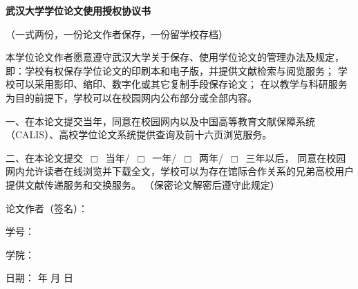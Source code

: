 %
%

\newpage
\vspace*{20pt}
\thispagestyle{empty}
\begin{center}{\heiti \bfseries 武汉大学学位论文使用授权协议书}\end{center}

\vspace*{4pt}

\begin{center}{（一式两份，一份论文作者保存，一份留学校存档）}\end{center}

\vspace*{4pt}

本学位论文作者愿意遵守武汉大学关于保存、使用学位论文的管理办法及规定，
即：学校有权保存学位论文的印刷本和电子版，并提供文献检索与阅览服务；
学校可以采用影印、缩印、数字化或其它复制手段保存论文；
在以教学与科研服务为目的前提下，学校可以在校园网内公布部分或全部内容。

一、在本论文提交当年，同意在校园网内以及中国高等教育文献保障系统（CALIS）、高校学位论文系统提供查询及前十六页浏览服务。

二、在本论文提交~$\Box$~当年/~$\Box$~一年/~$\Box$~两年/~$\Box$~三年以后，
同意在校园网内允许读者在线浏览并下载全文，学校可以为存在馆际合作关系的兄弟高校用户提供文献传递服务和交换服务。
（保密论文解密后遵守此规定）

\vskip 0.8cm

论文作者（签名）：\raisebox{-1ex}{\underline{\makebox[3.54cm][c]{}}}
\vskip 0.8cm

学\qquad 号：\raisebox{-1ex}{\underline{\makebox[5cm][c]{}}}
\vskip 0.8cm

学\qquad 院：\raisebox{-1ex}{\underline{\makebox[5cm][c]{}}}

\vskip 1cm
\begin{flushright}
日期：\hskip2cm 年\hskip1.2cm 月\hskip1.2cm 日
\end{flushright}

